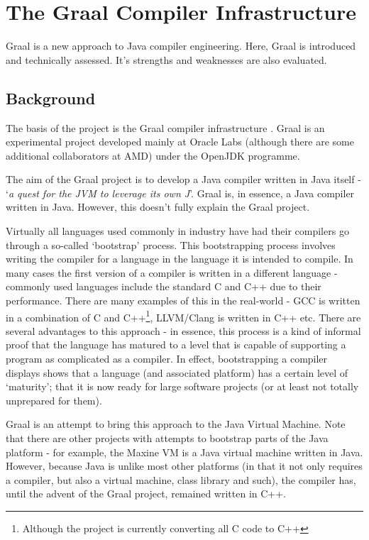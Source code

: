 \chapter{The Graal Compiler Infrastructure} \label{chp:graal}
Graal is a new approach to Java compiler engineering. Here, Graal is introduced and technically assessed. It's strengths and weaknesses are also evaluated.

\section{Background} \label{sec:graal/background}
The basis of the project is the Graal compiler infrastructure \citep{Graal}. Graal is an experimental project developed mainly at Oracle Labs (although there are some additional collaborators at AMD) under the OpenJDK programme.
	
The aim of the Graal project is to develop a Java compiler written in Java itself - `\textit{a quest for the JVM to leverage its own J}'. Graal is, in essence, a Java compiler written in Java. However, this doesn't fully explain the Graal project.
	
Virtually all languages used commonly in industry have had their compilers go through a so-called `bootstrap' process. This bootstrapping process involves writing the compiler for a language in the language it is intended to compile. In many cases the first version of a compiler is written in a different language - commonly used languages include the standard C and C++ due to their performance. There are many examples of this in the real-world - GCC is written in a combination of C and C++\footnote{Although the project is currently converting all C code to C++}, LLVM/Clang is written in C++ etc. There are several advantages to this approach - in essence, this process is a kind of informal proof that the language has matured to a level that is capable of supporting a program as complicated as a compiler. In effect, bootstrapping a compiler displays shows that a language (and associated platform) has a certain level of `maturity'; that it is now ready for large software projects (or at least not totally unprepared for them).

Graal is an attempt to bring this approach to the Java Virtual Machine. Note that there are other projects with attempts to bootstrap parts of the Java platform - for example, the Maxine VM is a Java virtual machine written in Java. However, because Java is unlike most other platforms (in that it not only requires a compiler, but also a virtual machine, class library and such), the compiler has, until the advent of the Graal project, remained written in C++.

